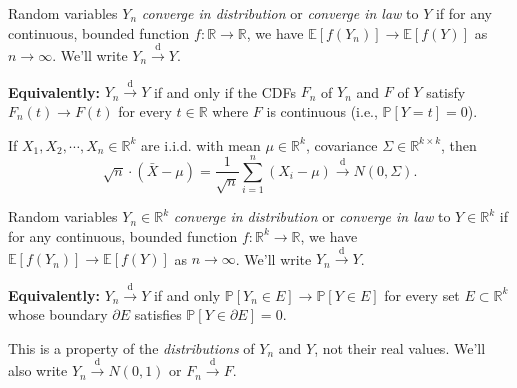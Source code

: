 \documentclass[a4paper]{article}
\begin{document}
\begin{defi}
	Random variables $Y_n$ \emph{converge in distribution} or \emph{converge in law} to $Y$ if for any continuous, bounded function $f: \mathbb{R} \to \mathbb{R}$, we have $\mathbb{E}[f(Y_n)] \to \mathbb{E}[f(Y)]$ as $n \to \infty$. We'll write $Y_n \stackrel{\text{d}}{\longrightarrow} Y$.
\end{defi}

\noindent \textbf{Equivalently:} $Y_n \stackrel{\text{d}}{\longrightarrow} Y$ if and only if the CDFs $F_n$ of $Y_n$ and $F$ of $Y$ satisfy $F_n(t) \to F(t)$ for every $t \in \mathbb{R}$ where $F$ is continuous (i.e., $\mathbb{P}[Y=t] = 0$).

\begin{thm}
	If $X_1,X_2,\cdots,X_n \in \mathbb{R}^k$ are i.i.d. with mean $\mu \in \mathbb{R}^k$, covariance $\Sigma \in \mathbb{R}^{k \times k}$, then
	\begin{equation}
		\sqrt{n} \cdot (\bar{X} -\mu) = \frac{1}{\sqrt{n}} \sum\limits_{i=1}^n(X_i - \mu) \stackrel{\text{d}}{\longrightarrow} N(0,\Sigma).
	\end{equation}
\end{thm}  

\begin{defi}
	Random variables $Y_n \in \mathbb{R}^k$ \emph{converge in distribution} or \emph{converge in law} to $Y \in \mathbb{R}^k$ if for any continuous, bounded function $f: \mathbb{R}^k \to \mathbb{R}$, we have $\mathbb{E}[f(Y_n)] \to \mathbb{E}[f(Y)]$ as $n \to \infty$. We'll write $Y_n \stackrel{\text{d}}{\longrightarrow} Y$.
\end{defi}

\noindent \textbf{Equivalently:} $Y_n \stackrel{\text{d}}{\longrightarrow} Y$ if and only $\mathbb{P}[Y_n \in E] \to \mathbb{P}[Y \in E]$ for every set $E \subset \mathbb{R}^k$ whose boundary $\partial E$ satisfies $\mathbb{P}[Y \in \partial E] = 0$.

\begin{note}
	This is a property of the \emph{distributions} of $Y_n$ and $Y$, not their real values. We'll also write $Y_n \stackrel{\text{d}}{\longrightarrow} N(0,1)$ or $F_n \stackrel{\text{d}}{\longrightarrow} F$.
\end{note}
\end{document}
